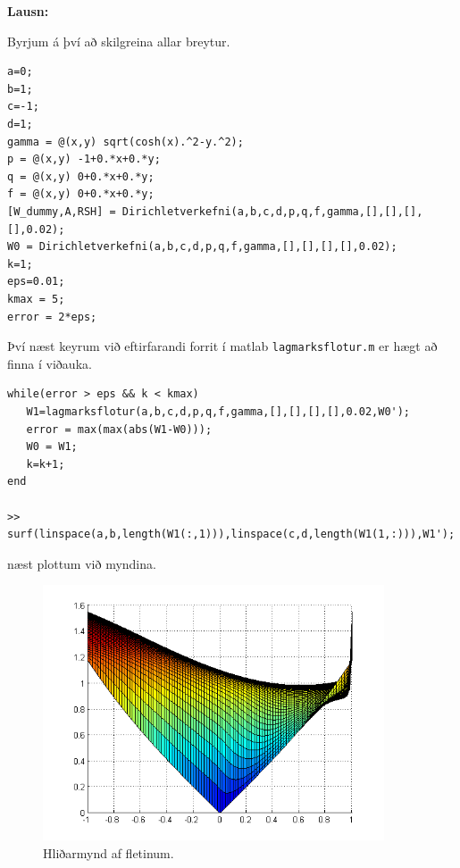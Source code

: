 \documentclass[11pt,a4paper,titlepage]{article}
\begin{document}
\par
\textbf{Lausn:}\par
Byrjum á því að skilgreina allar breytur. 
\begin{verbatim}
a=0;
b=1;
c=-1;
d=1;
gamma = @(x,y) sqrt(cosh(x).^2-y.^2);
p = @(x,y) -1+0.*x+0.*y;
q = @(x,y) 0+0.*x+0.*y;
f = @(x,y) 0+0.*x+0.*y;
[W_dummy,A,RSH] = Dirichletverkefni(a,b,c,d,p,q,f,gamma,[],[],[],[],0.02);
W0 = Dirichletverkefni(a,b,c,d,p,q,f,gamma,[],[],[],[],0.02);
k=1;
eps=0.01;
kmax = 5;
error = 2*eps;
\end{verbatim}

Því næst keyrum við eftirfarandi forrit í matlab \verb|lagmarksflotur.m| er hægt að finna í viðauka.  
\begin{verbatim}
while(error > eps && k < kmax)
   W1=lagmarksflotur(a,b,c,d,p,q,f,gamma,[],[],[],[],0.02,W0');
   error = max(max(abs(W1-W0)));
   W0 = W1;
   k=k+1;
end

>> surf(linspace(a,b,length(W1(:,1))),linspace(c,d,length(W1(1,:))),W1');
\end{verbatim}

næst plottum við myndina. 
  \begin{figure}[h!]
      \centering
      \includegraphics[width=0.9\textwidth]{lagmarksflotur_hlid.png}
      \caption{Hliðarmynd af fletinum.}
      \label{fig:awesome_image12}
  \end{figure}
  
\end{document}
